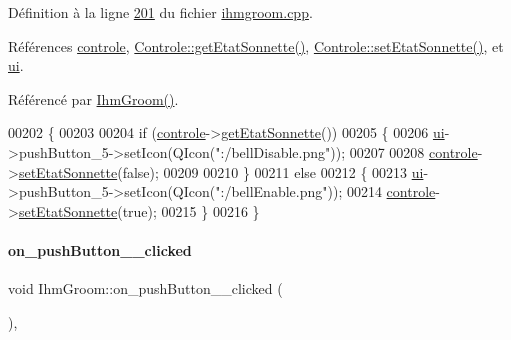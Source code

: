 Définition à la ligne \hyperlink{ihmgroom_8cpp_source_l00201}{201} du fichier \hyperlink{ihmgroom_8cpp_source}{ihmgroom.\+cpp}.



Références \hyperlink{ihmgroom_8h_source_l00089}{controle}, \hyperlink{controle_8cpp_source_l00033}{Controle\+::get\+Etat\+Sonnette()}, \hyperlink{controle_8cpp_source_l00028}{Controle\+::set\+Etat\+Sonnette()}, et \hyperlink{ihmgroom_8h_source_l00085}{ui}.



Référencé par \hyperlink{ihmgroom_8cpp_source_l00031}{Ihm\+Groom()}.


\begin{DoxyCode}
00202 \{
00203 
00204     \textcolor{keywordflow}{if} (\hyperlink{class_ihm_groom_acead732c303b50a3285bd311ac8a3b4f}{controle}->\hyperlink{class_controle_acabf3768430c7f1acb268ca0fa1ddf99}{getEtatSonnette}())
00205     \{
00206         \hyperlink{class_ihm_groom_af652e1ce199213b7867e44cf589c06b8}{ui}->pushButton\_5->setIcon(QIcon(\textcolor{stringliteral}{":/bellDisable.png"}));
00207 
00208         \hyperlink{class_ihm_groom_acead732c303b50a3285bd311ac8a3b4f}{controle}->\hyperlink{class_controle_ac706c5e9ede46dab70631281b084e233}{setEtatSonnette}(\textcolor{keyword}{false});
00209 
00210     \}
00211     \textcolor{keywordflow}{else}
00212     \{
00213         \hyperlink{class_ihm_groom_af652e1ce199213b7867e44cf589c06b8}{ui}->pushButton\_5->setIcon(QIcon(\textcolor{stringliteral}{":/bellEnable.png"}));
00214         \hyperlink{class_ihm_groom_acead732c303b50a3285bd311ac8a3b4f}{controle}->\hyperlink{class_controle_ac706c5e9ede46dab70631281b084e233}{setEtatSonnette}(\textcolor{keyword}{true});
00215     \}
00216 \}
\end{DoxyCode}
\mbox{\label{class_ihm_groom_adc890fcb2368c7bf7654d8ed4af4912a}} 
\paragraph{\texorpdfstring{on\+\_\+push\+Button\+\_\+\_\+clicked}{on\_pushButton\_2\_clicked}}
{\footnotesize\ttfamily void Ihm\+Groom\+::on\+\_\+push\+Button\+\_\+\_\+clicked (\begin{DoxyParamCaption}{ }\end{DoxyParamCaption})\hspace{0.3cm}{\ttfamily [private]}, {\ttfamily [slot]}}



